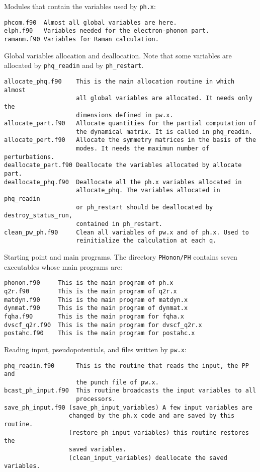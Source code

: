 \documentclass[12pt,a4paper]{article}
\def\phx{\texttt{ph.x}}
\begin{document}
Modules that contain the variables used by \phx:

\begin{verbatim}
phcom.f90  Almost all global variables are here.
elph.f90   Variables needed for the electron-phonon part.
ramanm.f90 Variables for Raman calculation.

\end{verbatim}

Global variables allocation and deallocation. Note that some
variables are allocated by \texttt{phq\_readin} and by \texttt{ph\_restart}.

\begin{verbatim}
allocate_phq.f90    This is the main allocation routine in which almost 
                    all global variables are allocated. It needs only the 
                    dimensions defined in pw.x.
allocate_part.f90   Allocate quantities for the partial computation of
                    the dynamical matrix. It is called in phq_readin.          
allocate_pert.f90   Allocate the symmetry matrices in the basis of the 
                    modes. It needs the maximun number of perturbations.              
deallocate_part.f90 Deallocate the variables allocated by allocate part.
deallocate_phq.f90  Deallocate all the ph.x variables allocated in 
                    allocate_phq. The variables allocated in phq_readin
                    or ph_restart should be deallocated by destroy_status_run,
                    contained in ph_restart.       
clean_pw_ph.f90     Clean all variables of pw.x and of ph.x. Used to 
                    reinitialize the calculation at each q.               
\end{verbatim}

Starting point and main programs. The directory \texttt{PHonon/PH} contains 
seven executables whose main programs are:

\begin{verbatim}
phonon.f90     This is the main program of ph.x
q2r.f90        This is the main program of q2r.x
matdyn.f90     This is the main program of matdyn.x
dynmat.f90     This is the main program of dynmat.x
fqha.f90       This is the main program for fqha.x
dvscf_q2r.f90  This is the main program for dvscf_q2r.x
postahc.f90    This is the main program for postahc.x
\end{verbatim}

Reading input, pseudopotentials, and files written by \texttt{pw.x}:

\begin{verbatim}
phq_readin.f90      This is the routine that reads the input, the PP and
                    the punch file of pw.x.
bcast_ph_input.f90  This routine broadcasts the input variables to all
                    processors.
save_ph_input.f90 (save_ph_input_variables) A few input variables are 
                  changed by the ph.x code and are saved by this routine.
                  (restore_ph_input_variables) this routine restores the
                  saved variables.
                  (clean_input_variables) deallocate the saved variables.
\end{verbatim}
\end{document}
